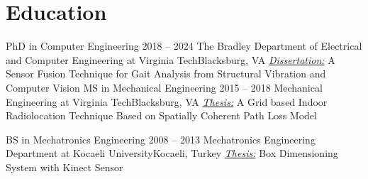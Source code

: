 \documentclass[letterpaper,11pt]{article}
\begin{document}
  \resumeSubHeadingListEnd
\vspace{-16pt}

\section{Education}
  \resumeSubHeadingListStart
    \resumeSubheading
      {PhD in Computer Engineering}
	  {2018 -- 2024}
      {The Bradley Department of Electrical and Computer Engineering at Virginia Tech}{Blacksburg, VA}
		\vspace{-2ex}
		\resumeItemListStart
	    \resumeItemListEnd
	  \textit{\underline{Dissertation:}} A Sensor Fusion Technique for Gait Analysis from Structural Vibration and Computer Vision
	  \resumeSubheading
      {MS in Mechanical Engineering}
	  {2015 -- 2018}
      {Mechanical Engineering at Virginia Tech}{Blacksburg, VA}
	  \textit{\underline{Thesis:}} A Grid based Indoor Radiolocation Technique Based on Spatially Coherent Path Loss Model

	  \resumeSubheading
      {BS in Mechatronics Engineering}
	  {2008 -- 2013}
      {Mechatronics Engineering Department at Kocaeli University}{Kocaeli, Turkey}
	  \textit{\underline{Thesis:}} Box Dimensioning System with Kinect Sensor
  \resumeSubHeadingListEnd

\end{document}
